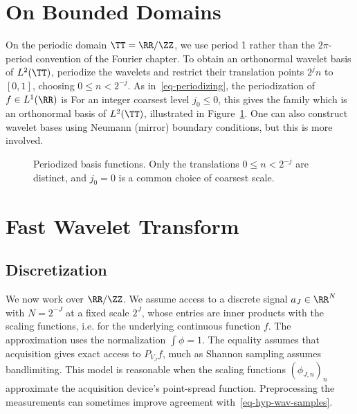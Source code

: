 \section{On Bounded Domains}

On the periodic domain $\TT=\RR/\ZZ$, we use period 1 rather than the $2\pi$-period convention of the Fourier chapter. To obtain an orthonormal wavelet basis of $L^2(\TT)$, periodize the wavelets and restrict their translation points $2^j n$ to $[0,1]$, choosing $0 \leq n < 2^{-j}$. As in~\eqref{eq-periodizing}, the periodization of $f \in L^1(\RR)$ is
For an integer coarsest level $j_0\leq0$, this gives the family
which is an orthonormal basis of $L^2(\TT)$, illustrated in Figure~\ref{fig-periodize}.
%
One can also construct wavelet bases using Neumann (mirror) boundary conditions, but this is more involved.



\begin{figure}[tbp]
\centering
{}\hfill
{}
\caption{Periodized basis functions. Only the translations $0\leq n<2^{-j}$ are distinct, and $j_0=0$ is a common choice of coarsest scale.}
\label{fig-periodize}
\end{figure}



\section{Fast Wavelet Transform}\label{sec-fast-wavelet-transform}

\subsection{Discretization}

We now work over $\RR/\ZZ$.
%
We assume access to a discrete signal $a_J \in \RR^N$ with $N = 2^{-J}$ at a fixed scale $2^J$, whose entries are inner products with the scaling functions, i.e.
for the underlying continuous function $f$. The approximation uses the normalization $\int\phi=1$. The equality assumes that acquisition gives exact access to $P_{V_J}f$, much as Shannon sampling assumes bandlimiting. This model is reasonable when the scaling functions $(\phi_{J,n})_n$ approximate the acquisition device's point-spread function. Preprocessing the measurements can sometimes improve agreement with~\eqref{eq-hyp-wav-samples}.

